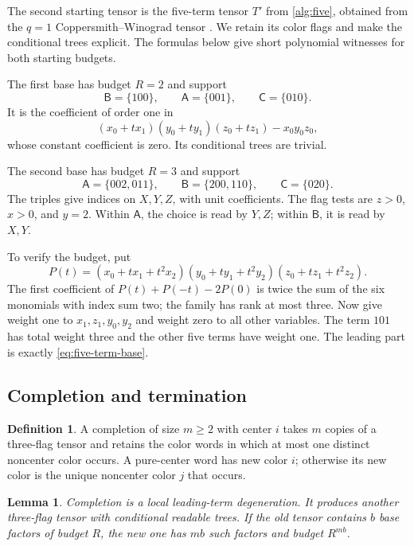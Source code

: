 \documentclass[11pt]{article}
\numberwithin{equation}{section}
\newtheorem{lemma}[theorem]{Lemma}
\theoremstyle{definition}
\newtheorem{definition}[theorem]{Definition}
\theoremstyle{remark}
\begin{document}
The second starting tensor is the five-term tensor \(T'\) from
\eqref{alg:five}, obtained from the \(q=1\) Coppersmith--Winograd
tensor \cite[Section~7]{cw}.  We retain its color flags and make the
conditional trees explicit.  The formulas below give short polynomial
witnesses for both starting budgets.

The first base has budget \(R=2\) and support
\[
 \mathsf B=\{100\},\qquad \mathsf A=\{001\},\qquad \mathsf C=\{010\}.
\]
It is the coefficient of order one in
\[
 (x_0+t x_1)(y_0+t y_1)(z_0+t z_1)-x_0y_0z_0,
\]
whose constant coefficient is zero.
Its conditional trees are trivial.

The second base has budget \(R=3\) and support
\begin{equation}\label{eq:five-term-base}
 \mathsf A=\{002,011\},\qquad
 \mathsf B=\{200,110\},\qquad
 \mathsf C=\{020\}.
\end{equation}
The triples give indices on \(X,Y,Z\), with unit coefficients.
The flag tests are \(z>0\), \(x>0\), and \(y=2\).
Within \(\mathsf A\), the choice is read by \(Y,Z\); within \(\mathsf B\),
it is read by \(X,Y\).

To verify the budget, put
\[
 P(t)=(x_0+t x_1+t^2x_2)
      (y_0+t y_1+t^2y_2)
      (z_0+t z_1+t^2z_2).
\]
The first coefficient of
\(P(t)+P(-t)-2P(0)\) is twice the sum of the six monomials with
index sum two; the family has rank at most three.
Now give weight one to \(x_1,z_1,y_0,y_2\) and weight zero to all
other variables.
The term \(101\) has total weight three and the other five terms
have weight one.
The leading part is exactly \eqref{eq:five-term-base}.

\subsection{Completion and termination}

\begin{definition}\label{def:completion}
A completion of size \(m\ge2\) with center \(i\) takes \(m\) copies
of a three-flag tensor and retains the color words in which at most
one distinct noncenter color occurs.
A pure-center word has new color \(i\); otherwise its new color is
the unique noncenter color \(j\) that occurs.
\end{definition}

\begin{lemma}\label{lem:completion}
Completion is a local leading-term degeneration.
It produces another three-flag tensor with conditional readable trees.
If the old tensor contains \(b\) base factors of budget \(R\), the new
one has \(mb\) such factors and budget \(R^{mb}\).
\end{lemma}
\end{document}
